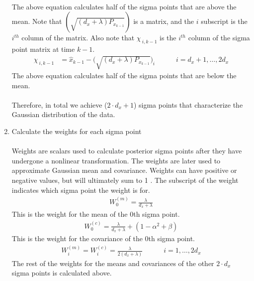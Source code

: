 \begin{enumerate}
\begin{align*}
        \end{align*}
        The above equation calculates half of the sigma points that are above the mean. Note that $(\sqrt{(d_{x}+\lambda)P_{x_{k-1}}})$ is a matrix, and the $i$ subscript is the $i^{th}$ column of the matrix. Also note that $\chi_{\ i,k-1}$ is the $i^{th}$ column of the sigma point matrix at time $k-1$.
        \begin{align*}
        \chi_{\ i,k-1} &= \hat{x}_{k-1} - \bigg(\sqrt{(d_{x}+\lambda)P_{x_{k-1}}} \bigg)_{i} \quad \quad \quad  i=d_{x}+1,\dots,2d_{x}
    \end{align*}
    The above equation calculates half of the sigma points that are below the mean. \\ \\
Therefore, in total we achieve ($2 \cdot d_x + 1$) sigma points that characterize the Gaussian distribution of the data.


        \item Calculate the weights for each sigma point \\ \\
        Weights are scalars used to calculate posterior sigma points after they have undergone a nonlinear transformation. The weights are later used to approximate Gaussian mean and covariance. Weights can have positive or negative values, but will ultimately sum to 1 \cite{article6}. The subscript of the weight indicates which sigma point the weight is for. 
        \begin{align*}
        W^{(m)}_{0} = \frac{\lambda}{d_{x}+ \lambda} 
         \end{align*}
         This is the weight for the mean of the 0th sigma point. 
        \begin{align*}
        W^{(c)}_{0} = \frac{\lambda}{d_{x}+ \lambda} + (1 - \alpha^{2} + \beta) 
         \end{align*}
         This is the weight for the covariance of the 0th sigma point. 
        \begin{align*}
        W^{(m)}_{i} = W^{(c)}_{i} = \frac{\lambda}{2(d_{x}+ \lambda) } \quad \quad \quad i=1,\dots,2d_{x}
            \end{align*}
           The rest of the weights for the means and covariances of the other $2 \cdot d_x$ sigma points is calculated above.
           
           
           

\end{enumerate}
